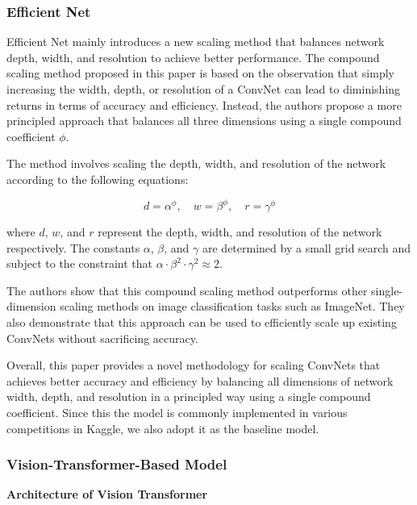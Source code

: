 \documentclass{article}
\begin{document}
\subsubsection{Efficient Net}
Efficient Net\cite{tan2019efficientnet} mainly introduces a new scaling method that balances network depth, width, and resolution to achieve better performance. The compound scaling method proposed in this paper is based on the observation that simply increasing the width, depth, or resolution of a ConvNet can lead to diminishing returns in terms of accuracy and efficiency. Instead, the authors propose a more principled approach that balances all three dimensions using a single compound coefficient $\phi$. 

The method involves scaling the depth, width, and resolution of the network according to the following equations:

\begin{equation}
d = \alpha^\phi, \quad w = \beta^\phi, \quad r = \gamma^\phi
\end{equation}

where $d$, $w$, and $r$ represent the depth, width, and resolution of the network respectively. The constants $\alpha$, $\beta$, and $\gamma$ are determined by a small grid search and subject to the constraint that $\alpha \cdot \beta^2 \cdot \gamma^2 \approx 2$. 

The authors show that this compound scaling method outperforms other single-dimension scaling methods on image classification tasks such as ImageNet. They also demonstrate that this approach can be used to efficiently scale up existing ConvNets without sacrificing accuracy. 

Overall, this paper provides a novel methodology for scaling ConvNets that achieves better accuracy and efficiency by balancing all dimensions of network width, depth, and resolution in a principled way using a single compound coefficient. Since this the model is commonly implemented in various competitions in Kaggle, we also adopt it as the baseline model.

\subsubsection{Vision-Transformer-Based Model}
\textbf{Architecture of Vision Transformer}
\end{document}
